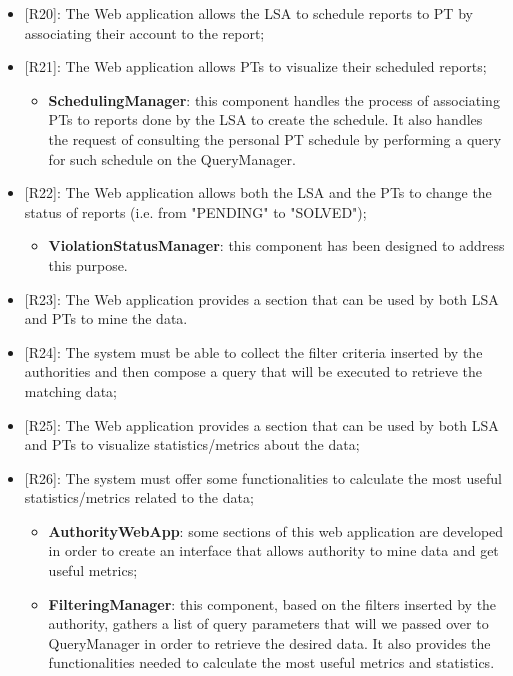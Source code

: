 \begin{itemize}
\begin{itemize}
    \end{itemize}    
    \item {[R20]}: The Web application allows the LSA to schedule reports to PT by associating their account to the report;
    \item[] {[R21]}: The Web application allows PTs to visualize their scheduled reports;
    \begin{itemize}
      \item \textbf{SchedulingManager}: this component handles the process of associating PTs to reports done by the LSA to create the schedule. It also handles the request of consulting the personal PT schedule by performing a query for such schedule on the QueryManager.
    \end{itemize}
    \item {[R22]}: The Web application allows both the LSA and the PTs to change the status of reports (i.e. from "PENDING" to "SOLVED");
    \begin{itemize}
      \item \textbf{ViolationStatusManager}: this component has been designed to address this purpose.
    \end{itemize}
    \item {[R23]}: The Web application provides a section that can be used by both LSA and PTs to mine the data.
    \item[] {[R24]}: The system must be able to collect the filter criteria inserted by the authorities and then compose a query that will be executed to retrieve the matching data;
    \item[] {[R25]}: The Web application provides a section that can be used by both LSA and PTs to visualize statistics/metrics about the data;
    \item[] {[R26]}: The system must offer some functionalities to calculate the most useful statistics/metrics related to the data;
    \begin{itemize}
      \item \textbf{AuthorityWebApp}: some sections of this web application are developed in order to create an interface that allows authority to mine data and get useful metrics;
      \item \textbf{FilteringManager}: this component, based on the filters inserted by the authority, gathers a list of query parameters that will we passed over to QueryManager in order to retrieve the desired data. It also provides the functionalities needed to calculate the most useful metrics and statistics.
    \end{itemize}    

\end{itemize}
